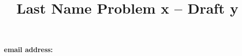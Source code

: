 \documentclass[12pt]{article}\pagestyle{myheadings}
\title{Last Name Problem x -- Draft y}
\author{}
\theoremstyle{plain}
\begin{document}
\maketitle

\begin{center}
\textbf{email address: }
\end{center}
\end{document}
